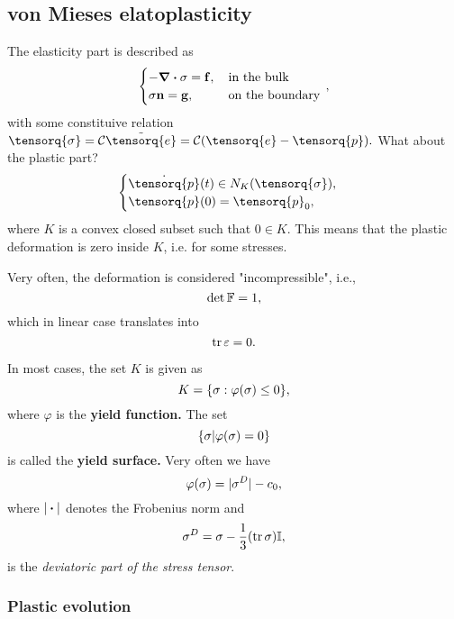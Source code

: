\documentclass[11pt]{scrartcl} %
\begin{document}
\subsection{von Mieses elatoplasticity}
\label{sec:von_mieses}

The elasticity part is described as
\[
	\begin{cases}
		- \divergence{\tensorq{\sigma}} = \vb{f}, &  \, \text{in the bulk} \,\\
		\tensorq{\sigma} \vb{n} = \vb{g}, & \, \text{on the boundary} \, \\
	\end{cases},
\]
with some constituive relation $\tensorq{\sigma} = \mathcal{C}\tilde{\tensorq{e}} = \mathcal{C}\qty(\tensorq{e}-\tensorq{p}).$
What about the plastic part? 
\[
	\begin{cases} 
		\dot{\tensorq{p}}(t) \in N_K\qty(\tensorq{\sigma}), & \\
		\tensorq{p}(0)=\tensorq{p}_0, &
	\end{cases}
\]
where $K$ is a convex closed subset such that $0 \in K$. This means that the plastic deformation is zero inside $K$, i.e. for some stresses. 

\begin{remark}
    Very often, the deformation is considered "incompressible", i.e.,
    \[
	    \det \mathbb{F} = 1,
    \]
    which in linear case translates into
    \[
	    \tr \mathbb{\varepsilon} = 0.
    \]
\end{remark}

In most cases, the set $K$ is given as
\[
	K = \{ \mathbb{\sigma}:\varphi\qty(\mathbb{\sigma}) \leq 0\},
\]
where $\varphi$ is the \textbf{yield function.} The set
\[
	\{\mathbb{\sigma}| \varphi\qty(\mathbb{\sigma}) = 0\}
\]
is called the \textbf{yield surface.} Very often we have
\[
	\varphi\qty(\mathbb{\sigma}) = |\mathbb{\sigma}^D|-c_0,
\]
where $| \vdot |$ denotes the Frobenius norm and
\[
	\mathbb{\sigma}^D = \mathbb{\sigma} - \frac{1}{3}\qty(\tr \mathbb{\sigma})\mathbb{I},
\]
is the \textit{deviatoric part of the stress tensor}.

\subsubsection{Plastic evolution}
\label{sec:plastic_evolution}
\end{document}
